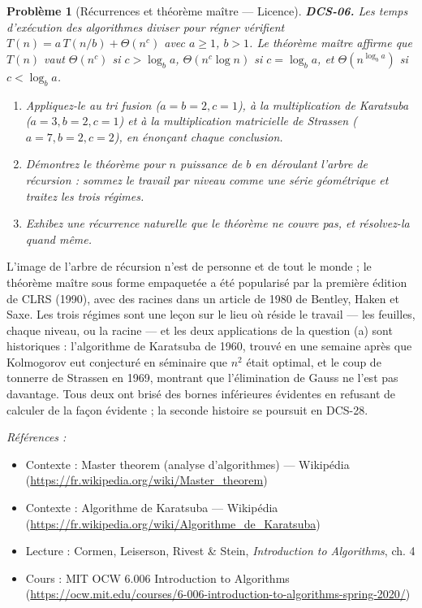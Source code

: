 \documentclass[11pt]{article}
\newtheorem{problem}{Problème}
\newenvironment{refs}{\par\small\noindent\emph{Références :}\begin{itemize}\setlength\itemsep{0pt}}{\end{itemize}\normalsize}
\begin{document}
\bigskip

\begin{problem}[{Récurrences et théorème maître --- Licence}]
\textbf{DCS-06.} Les temps d'exécution des algorithmes \og{} diviser pour régner \fg{} vérifient $T(n) = a\,T(n/b) + \Theta(n^c)$ avec $a \ge 1$, $b > 1$. Le théorème maître affirme que $T(n)$ vaut $\Theta(n^c)$ si $c > \log_b a$, $\Theta(n^c \log n)$ si $c = \log_b a$, et $\Theta(n^{\log_b a})$ si $c < \log_b a$.
\begin{enumerate}
\item[(a)] Appliquez-le au tri fusion ($a=b=2, c=1$), à la multiplication de Karatsuba ($a=3, b=2, c=1$) et à la multiplication matricielle de Strassen ($a=7, b=2, c=2$), en énonçant chaque conclusion.
\item[(b)] Démontrez le théorème pour $n$ puissance de $b$ en déroulant l'arbre de récursion : sommez le travail par niveau comme une série géométrique et traitez les trois régimes.
\item[(c)] Exhibez une récurrence naturelle que le théorème ne couvre pas, et résolvez-la quand même.
\end{enumerate}

\end{problem}

\noindent L'image de l'arbre de récursion n'est de personne et de tout le monde ; le \og{} théorème maître \fg{} sous forme empaquetée a été popularisé par la première édition de CLRS (1990), avec des racines dans un article de 1980 de Bentley, Haken et Saxe. Les trois régimes sont une leçon sur le lieu où réside le travail --- les feuilles, chaque niveau, ou la racine --- et les deux applications de la question (a) sont historiques : l'algorithme de Karatsuba de 1960, trouvé en une semaine après que Kolmogorov eut conjecturé en séminaire que $n^2$ était optimal, et le coup de tonnerre de Strassen en 1969, montrant que l'élimination de Gauss ne l'est pas davantage. Tous deux ont brisé des bornes inférieures \og{} évidentes \fg{} en refusant de calculer de la façon évidente ; la seconde histoire se poursuit en DCS-28.

\begin{refs}
\item Contexte : Master theorem (analyse d'algorithmes) --- Wikipédia (\url{https://fr.wikipedia.org/wiki/Master_theorem})
\item Contexte : Algorithme de Karatsuba --- Wikipédia (\url{https://fr.wikipedia.org/wiki/Algorithme_de_Karatsuba})
\item Lecture : Cormen, Leiserson, Rivest \& Stein, \textit{Introduction to Algorithms}, ch. 4
\item Cours : MIT OCW 6.006 Introduction to Algorithms (\url{https://ocw.mit.edu/courses/6-006-introduction-to-algorithms-spring-2020/})
\end{refs}
\end{document}
